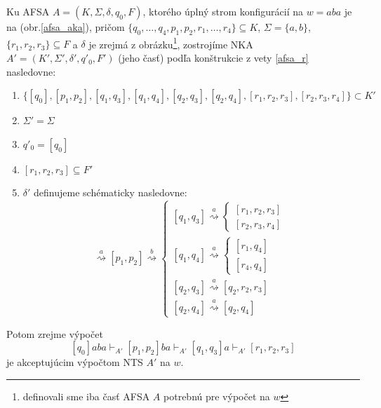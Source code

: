 \begin{priklad}
  Ku AFSA $A=(K,\Sigma,\delta,q_0,F)$, ktorého úplný strom
  konfigurácií na $w=aba$ je na (obr.\ref{afsa_aka}), pričom
  $\{q_0,\dots,q_4,p_1,p_2,r_1,\dots,r_4\}\subseteq K$,
  $\Sigma=\{a,b\}$, $\{r_1,r_2,r_3\}\subseteq F$ a $\delta$ je
  zrejmá z obrázku\footnote{definovali sme iba časť AFSA $A$
  potrebnú pre výpočet na $w$}, zostrojíme NKA
  $A'=(K',\Sigma',\delta',q'_0,F')$ (jeho časť) podľa konštrukcie z
  vety \ref{afsa_r} nasledovne:
  \begin{enumerate}
    \item
    $\{[q_0],[p_1,p_2],[q_1,q_3],[q_1,q_4],
    [q_2,q_3],[q_2,q_4],[r_1,r_2,r_3],[r_2,r_3,r_4]\}\subset K'$
    \item $\Sigma'=\Sigma$
    \item $q'_0=[q_0]$
    \item $[r_1,r_2,r_3]\subseteq F'$
    \item $\delta'$ definujeme schématicky nasledovne:
    \begin{displaymath}
    [q_0]\overset{a}{\rightsquigarrow}[p_1,p_2]\overset{b}{\rightsquigarrow}
    \left\{
    \begin{array}{l}
    {[q_1,q_3]}\overset{a}{\rightsquigarrow}
    \left\{
    \begin{array}{l}
    {[r_1,r_2,r_3]}\\
    {[r_2,r_3,r_4]}
    \end{array}
    \right.
    \\
    {[q_1,q_4]}\overset{a}{\rightsquigarrow}
    \left\{
    \begin{array}{l}
    {[r_1,q_4]}\\
    {[r_4,q_4]}
    \end{array}
    \right.
    \\
    {[q_2,q_3]}\overset{a}{\rightsquigarrow}
    {[q_2,r_2,r_3]}
    \\
    {[q_2,q_4]}\overset{a}{\rightsquigarrow}{[q_2,q_4]}
    \end{array}
    \right.
    \end{displaymath}
  \end{enumerate}
  Potom zrejme výpočet
  \[
  [q_0]aba\vdash_{A'}[p_1,p_2]ba\vdash_{A'}[q_1,q_3]a
  \vdash_{A'}[r_1,r_2,r_3]
  \]
  je akceptujúcim výpočtom NTS $A'$ na $w$.
\end{priklad}

